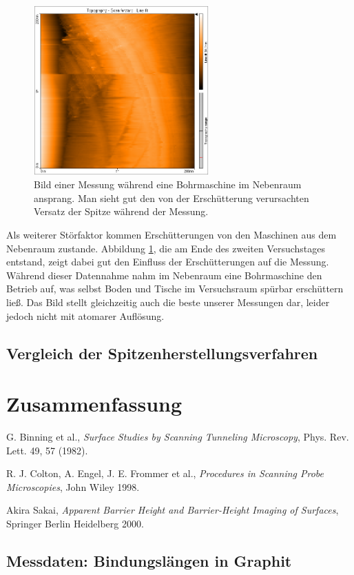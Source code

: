 \documentclass[10pt, a4paper]{article}
\begin{document}
\begin{figure}[h]
\centering
\includegraphics[width=0.6\textwidth]{./grafiken/bohrer.png}
\caption{Bild einer Messung während eine Bohrmaschine im Nebenraum ansprang. Man sieht gut den von der Erschütterung verursachten Versatz der Spitze während der Messung.}
\label{fig:bohrer}
\end{figure}

Als weiterer Störfaktor kommen Erschütterungen von den Maschinen aus dem Nebenraum zustande. Abbildung \ref{fig:bohrer}, die am Ende des zweiten Versuchstages entstand, zeigt dabei gut den Einfluss der Erschütterungen auf die Messung.
Während dieser Datennahme nahm im Nebenraum eine Bohrmaschine den Betrieb auf, was selbst Boden und Tische im Versuchsraum spürbar erschüttern ließ.
Das Bild stellt gleichzeitig auch die beste unserer Messungen dar, leider jedoch nicht mit atomarer Auflösung.

\subsection{Vergleich der Spitzenherstellungsverfahren}

\section{Zusammenfassung}


\begin{thebibliography}{9}

  G. Binning et al.,
  \emph{Surface Studies by Scanning Tunneling Microscopy},
  Phys. Rev. Lett. 49, 57 (1982).

  R. J. Colton, A. Engel, J. E. Frommer et al.,
  \emph{Procedures in Scanning Probe Microscopies},
  John Wiley 1998.

  Akira Sakai,
  \emph{Apparent Barrier Height and Barrier-Height Imaging of Surfaces},
  Springer Berlin Heidelberg 2000.
  
\end{thebibliography}

\newpage

\begin{appendix}
\section{Messdaten: Bindungslängen in Graphit}
\label{messw:laenge}


\end{appendix}
\end{document}
